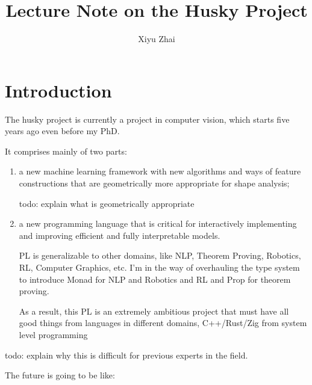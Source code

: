 \documentclass[11pt, oneside]{article}   	%
\title{Lecture Note on the Husky Project}
\author{Xiyu Zhai}
\date{}							%
\theoremstyle{definition}
\begin{document}
\maketitle
\tableofcontents
\section{Introduction}

The husky project is currently a project in computer vision, which starts five years ago even before my PhD.

It comprises mainly of two parts:
\begin{enumerate}[(1)]
	\item a new machine learning framework with new algorithms and ways of feature constructions that are geometrically more appropriate for shape analysis;

	\begin{rmk}
	todo: explain what is geometrically appropriate
	\end{rmk}
	\item a new programming language that is critical for interactively implementing and improving efficient and fully interpretable models.

	\begin{rmk}
		PL is generalizable to other domains, like NLP, Theorem Proving, Robotics, RL, Computer Graphics, etc. I'm in the way of overhauling the type system to introduce Monad for NLP and Robotics and RL and Prop for theorem proving.

		As a result, this PL is an extremely ambitious project that must have all good things from languages in different domains, C++/Rust/Zig from system level programming
	\end{rmk}
\end{enumerate}

\begin{rmk}
	todo: explain why this is difficult for previous experts in the field.
\end{rmk}

The future is going to be like:
\end{document}
